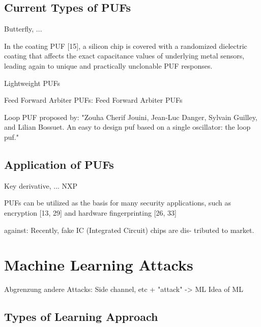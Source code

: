 \cite{Becker2015ThePUFs}


\subsection{Current Types of PUFs}

Butterfly, ...
\cite{Becker2015ThePUFs}

In the coating PUF [15], a silicon chip is covered with a randomized dielectric coating that affects the exact capacitance values of underlying metal sensors, leading again to unique and practically unclonable PUF responses. \cite{Armknecht2011AFunctions}

Lightweight PUFs \cite{Delvaux2014SecureImpossible}

Feed Forward Arbiter PUFs: Feed Forward Arbiter PUFs \cite{Ruhrmair2013PUFData}

Loop PUF proposed by: "Zouha Cherif Jouini, Jean-Luc Danger, Sylvain Guilley, and Lilian
Bossuet. An easy to design puf based on a single oscillator: the loop
puf."

\apufs


\subsection{Application of PUFs}

Key derivative, ...
\cite{Becker2015ThePUFs} NXP

PUFs can be utilized as the basis for many security applications, such as encryption [13, 29] and hardware fingerprinting [26, 33]
\cite{Tajik2014PhysicalPUFs}

against: Recently, fake IC (Integrated Circuit) chips are dis- tributed to market.
\cite{Machida2015ImplementationFPGA}


\section{Machine Learning Attacks}

Abgrenzung andere Attacks: Side channel, etc + "attack" -> ML
Idea of ML

\subsection{Types of Learning Approach}


